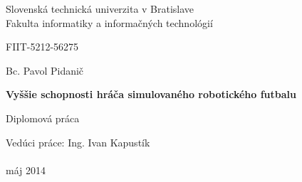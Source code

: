 \begin{titlepage}
	\begin{center}
	\large Slovenská technická univerzita v Bratislave 
	\normalsize \\
\large Fakulta informatiky a informačných technológií
	\end{center}
	\begin{center}
	  FIIT-5212-56275
	\end{center}
	\vfill
	\begin{center}
	
\begin{center}
\Large Bc. Pavol Pidanič
\end{center}
	
\begin{center}
\LARGE \textbf{Vyššie schopnosti hráča simulovaného robotického futbalu}
\end{center}
\begin{center}
\large Diplomová práca
\end{center}
\linespread{1.3}
	\end{center}
	\vfill
	Vedúci práce: Ing. Ivan Kapustík \\\\
	máj 2014
\end{titlepage}
